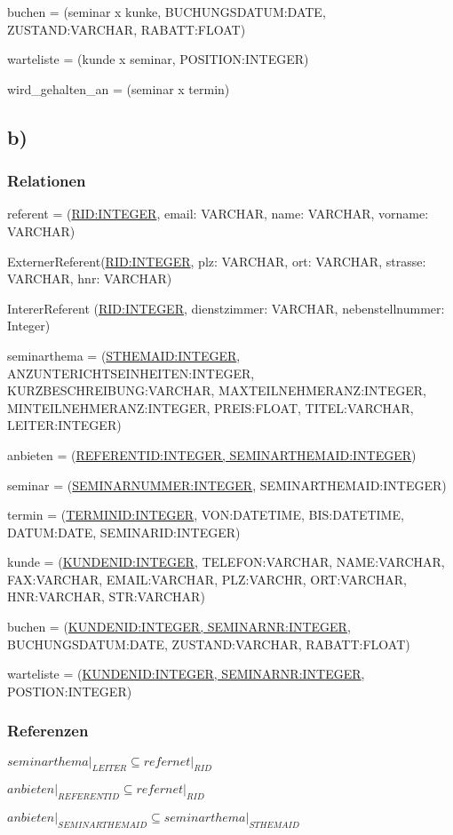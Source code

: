 \documentclass[10pt,a4paper]{report}
\begin{document}
buchen = (seminar x kunke, BUCHUNGSDATUM:DATE, ZUSTAND:VARCHAR, RABATT:FLOAT)

warteliste = (kunde x seminar, POSITION:INTEGER)

wird\_gehalten\_an = (seminar x termin)


\subsection{b)}
\subsubsection{Relationen}
referent = (\underline{RID:INTEGER}, email: VARCHAR, name: VARCHAR, vorname: VARCHAR)

ExternerReferent(\underline{RID:INTEGER}, plz: VARCHAR, ort: VARCHAR, strasse: VARCHAR, hnr: VARCHAR)

IntererReferent (\underline{RID:INTEGER}, dienstzimmer: VARCHAR, nebenstellnummer: Integer) 

seminarthema = (\underline{STHEMAID:INTEGER}, ANZUNTERICHTSEINHEITEN:INTEGER, KURZBESCHREIBUNG:VARCHAR, MAXTEILNEHMERANZ:INTEGER, MINTEILNEHMERANZ:INTEGER, PREIS:FLOAT, TITEL:VARCHAR, LEITER:INTEGER)

anbieten = (\underline{REFERENTID:INTEGER, SEMINARTHEMAID:INTEGER})

seminar = (\underline{SEMINARNUMMER:INTEGER}, SEMINARTHEMAID:INTEGER)

termin = (\underline{TERMINID:INTEGER}, VON:DATETIME, BIS:DATETIME, DATUM:DATE, SEMINARID:INTEGER)

kunde   = (\underline{KUNDENID:INTEGER}, TELEFON:VARCHAR, NAME:VARCHAR, FAX:VARCHAR, EMAIL:VARCHAR, PLZ:VARCHR, ORT:VARCHAR, HNR:VARCHAR, STR:VARCHAR)

buchen = (\underline{KUNDENID:INTEGER, SEMINARNR:INTEGER}, BUCHUNGSDATUM:DATE, ZUSTAND:VARCHAR, RABATT:FLOAT)

warteliste = (\underline{KUNDENID:INTEGER, SEMINARNR:INTEGER}, POSTION:INTEGER)

\subsubsection{Referenzen}
$seminarthema\vert_{LEITER} \subseteq refernet\vert_{RID}$

$anbieten\vert_{REFERENTID} \subseteq refernet\vert_{RID}$

$anbieten\vert_{SEMINARTHEMAID} \subseteq seminarthema\vert_{STHEMAID}$
\end{document}

